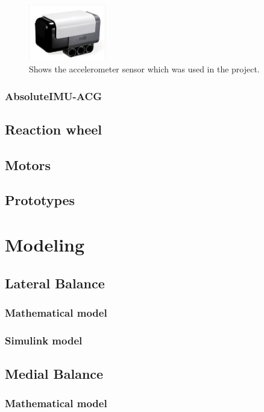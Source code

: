 \documentclass[a4paper]{article}
\begin{document}
	\begin{figure}[h]
		\centering
		\includegraphics[width=0.3\textwidth]{NXT_Gyro_Sensor}
		\caption{Shows the accelerometer sensor which was used in the project.}
		\label{fig:NXT_Acce_Sensor}
	\end{figure}
	
         
        
        
        \subsubsection{AbsoluteIMU-ACG}
    \subsection{Reaction wheel}
    \subsection{Motors}
    \subsection{Prototypes}

\section{Modeling}
	\subsection{Lateral Balance}
		\subsubsection{Mathematical model}
        \subsubsection{Simulink model}
    \subsection{Medial Balance}
		\subsubsection{Mathematical model}
\end{document}
